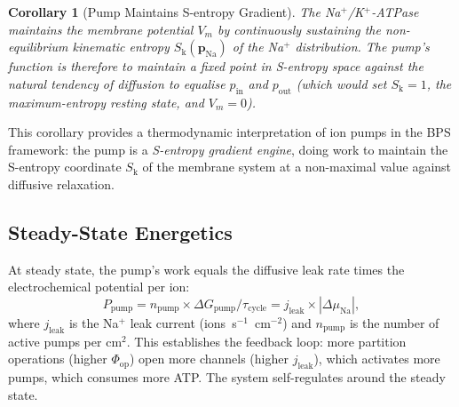 \documentclass[11pt,twocolumn,a4paper]{article}
\newtheorem{corollary}[theorem]{Corollary}
\theoremstyle{definition}
\theoremstyle{remark}
\newcommand{\Sk}{S_{\mathrm{k}}}
\begin{document}
\begin{corollary}[Pump Maintains S-entropy Gradient]
\label{cor:pump_se}
The Na$^+$/K$^+$-ATPase maintains the membrane potential $V_m$ by continuously
sustaining the non-equilibrium kinematic entropy $\Sk(\bm{p}_{\mathrm{Na}})$
of the Na$^+$ distribution. The pump's function is therefore to maintain a
fixed point in S-entropy space against the natural tendency of diffusion to
equalise $p_{\mathrm{in}}$ and $p_{\mathrm{out}}$ (which would set $\Sk = 1$,
the maximum-entropy resting state, and $V_m = 0$).
\end{corollary}

This corollary provides a thermodynamic interpretation of ion pumps in the BPS
framework: the pump is a \emph{S-entropy gradient engine}, doing work to maintain
the S-entropy coordinate $\Sk$ of the membrane system at a non-maximal value
against diffusive relaxation.

\subsection{Steady-State Energetics}

At steady state, the pump's work equals the diffusive leak rate times the
electrochemical potential per ion:
\begin{equation}
P_{\mathrm{pump}} = n_{\mathrm{pump}} \times \Delta G_{\mathrm{pump}} / \tau_{\mathrm{cycle}}
= j_{\mathrm{leak}} \times |\Delta\mu_{\mathrm{Na}}|,
\label{eq:steadystate}
\end{equation}
where $j_{\mathrm{leak}}$ is the Na$^+$ leak current (ions~s$^{-1}$~cm$^{-2}$)
and $n_{\mathrm{pump}}$ is the number of active pumps per cm$^2$. This establishes
the feedback loop: more partition operations (higher $\Phi_{\mathrm{op}}$) open
more channels (higher $j_{\mathrm{leak}}$), which activates more pumps, which
consumes more ATP. The system self-regulates around the steady state.
\end{document}
